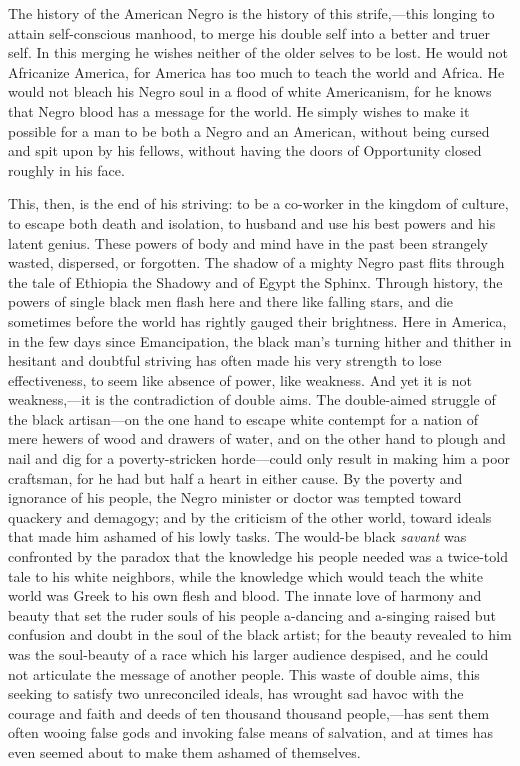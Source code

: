 The history of the American Negro is the history of this
strife,---this longing to attain self-conscious manhood, to merge his
double self into a better and truer self. In this merging he wishes
neither of the older selves to be lost. He would not Africanize
America, for America has too much to teach the world and Africa. He
would not bleach his Negro soul in a flood of white Americanism, for
he knows that Negro blood has a message for the world. He simply
wishes to make it possible for a man to be both a Negro and an
American, without being cursed and spit upon by his fellows, without
having the doors of Opportunity closed roughly in his face.

This, then, is the end of his striving: to be a co-worker in the
kingdom of culture, to escape both death and isolation, to husband and
use his best powers and his latent genius. These powers of body and
mind have in the past been strangely wasted, dispersed, or forgotten.
The shadow of a mighty Negro past flits through the tale of Ethiopia
the Shadowy and of Egypt the Sphinx. Through history, the powers of
single black men flash here and there like falling stars, and die
sometimes before the world has rightly gauged their brightness. Here
in America, in the few days since Emancipation, the black man's
turning hither and thither in hesitant and doubtful striving has often
made his very strength to lose effectiveness, to seem like absence of
power, like weakness. And yet it is not weakness,---it is the
contradiction of double aims. The double-aimed struggle of the black
artisan---on the one hand to escape white contempt for a nation of
mere hewers of wood and drawers  of water, and on the other
hand to plough and nail and dig for a poverty-stricken horde---could
only result in making him a poor craftsman, for he had but half a
heart in either cause. By the poverty and ignorance of his people, the
Negro minister or doctor was tempted toward quackery and demagogy; and
by the criticism of the other world, toward ideals that made him
ashamed of his lowly tasks. The would-be black \textit{savant} was
confronted by the paradox that the knowledge his people needed was a
twice-told tale to his white neighbors, while the knowledge which
would teach the white world was Greek to his own flesh and blood. The
innate love of harmony and beauty that set the ruder souls of his
people a-dancing and a-singing raised but confusion and doubt in the
soul of the black artist; for the beauty revealed to him was the
soul-beauty of a race which his larger audience despised, and he could
not articulate the message of another people. This waste of double
aims, this seeking to satisfy two unreconciled ideals, has wrought sad
havoc with the courage and faith and deeds of ten thousand thousand
people,---has sent them often wooing false gods and invoking false
means of salvation, and at times has even seemed about to make them
ashamed of themselves.

